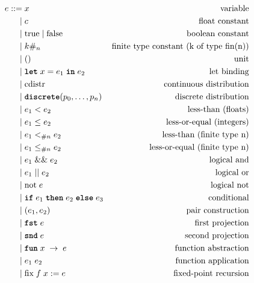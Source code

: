\begin{figure}[h]
\begin{align*}
e ::= &\; x                               & \text{variable} \\
    | &\; c                               & \text{float constant} \\
    | &\; \text{true} \mid \text{false}   & \text{boolean constant} \\
    | &\; \finconst{k}{n}                 & \text{finite type constant (k of type fin(n))} \\
    | &\; ()                              & \text{unit} \\
    | &\; \letkw \; x = e_1\; \inkw \; e_2  & \text{let binding} \\
    | &\; \text{cdistr}                   & \text{continuous distribution} \\
    | &\; \discrete(p_0, \ldots, p_{n})      & \text{discrete distribution} \\
    | &\; e_1 < e_2                       & \text{less-than (floats)} \\
    | &\; e_1 \leq e_2                    & \text{less-or-equal (integers)} \\
    | &\; e_1 \finlt{n} e_2              & \text{less-than (finite type n)} \\
    | &\; e_1 \finleq{n} e_2             & \text{less-or-equal (finite type n)} \\
    | &\; e_1 \logand e_2                 & \text{logical and} \\
    | &\; e_1 \logor e_2                  & \text{logical or} \\
    | &\; \text{not}\; e                  & \text{logical not} \\
    | &\; \ifkw \; e_1\; \thenkw \; e_2\; \elsekw \; e_3 & \text{conditional} \\
    | &\; (e_1, e_2)                      & \text{pair construction} \\
    | &\; \fstkw \; e                     & \text{first projection} \\
    | &\; \sndkw \; e                     & \text{second projection} \\
    | &\; \funkw \; x \; \rightarrow \; e & \text{function abstraction} \\
    | &\; e_1 \; e_2                      & \text{function application} \\
    | &\; \text{fix}\; f\; x := e         & \text{fixed-point recursion} \\

\end{align*}
\end{figure}
